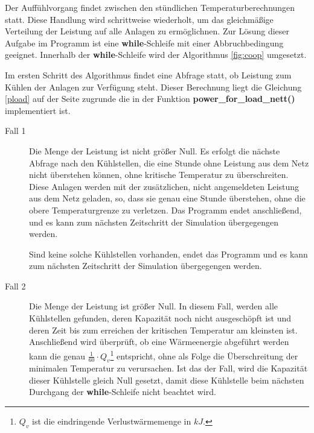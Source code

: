 Der Auff\"uhlvorgang findet zwischen den st\"undlichen Temperaturberechnungen
statt. Diese Handlung wird schrittweise wiederholt, um das gleichm\"a\ss ige
Verteilung der Leistung auf alle Anlagen zu erm\"oglichnen. Zur L\"osung dieser
Aufgabe im Programm ist eine \textbf{while}-Schleife mit einer Abbruchbedingung
geeignet. Innerhalb der \textbf{while}-Schleife wird der Algorithmus
\cref{fig:coop} umgesetzt.

Im ersten Schritt des Algorithmus findet eine Abfrage statt, ob Leistung zum
K\"uhlen der Anlagen zur Verf\"ugung steht. Dieser Berechnung liegt die
Gleichung \cref{pload} auf der Seite \pageref{pload} zugrunde die in der
Funktion \textbf{power\_for\_load\_nett()} implementiert ist.
\begin{description}
\item[Fall 1] Die Menge der Leistung ist nicht gr\"o\ss er Null. Es erfolgt die
n\"achste Abfrage nach den K\"uhlstellen, die eine Stunde ohne Leistung aus dem
Netz nicht \"uberstehen k\"onnen, ohne kritische Temperatur zu \"uberschreiten.
Diese Anlagen werden mit der zus\"atzlichen, nicht angemeldeten Leistung aus dem
Netz geladen, so, dass sie genau eine Stunde \"uberstehen, ohne die obere
Temperaturgrenze zu verletzen. Das Programm endet anschlie\ss end, und es kann
zum n\"achsten Zeitschritt der Simulation \"ubergegengen werden.

Sind keine solche K\"uhlstellen vorhanden, endet das Programm und es kann zum
n\"achsten Zeitschritt der Simulation \"ubergegengen werden.

\item[Fall 2] Die Menge der Leistung ist gr\"o\ss er Null. In diesem Fall,
werden alle K\"uhlstellen gefunden, deren Kapazit\"at noch nicht ausgesch\"opft
ist und deren Zeit bis zum erreichen der kritischen Temperatur am kleinsten ist.
Anschlie\ss end wird \"uberpr\"uft, ob eine W\"armeenergie abgef\"uhrt werden
kann die genau $\frac{1}{60}\cdot Q_v$\footnote{ $Q_v$ ist die eindringende
Verlustw\"armemenge in $kJ$.} entspricht, ohne als Folge die
\"Uberschreitung der minimalen Temperatur zu verursachen. Ist das der Fall, wird
die Kapazit\"at dieser K\"uhlstelle gleich Null gesetzt, damit diese
K\"uhlstelle beim n\"achsten Durchgang der \textbf{while}-Schleife nicht
beachtet wird.


\end{description}
